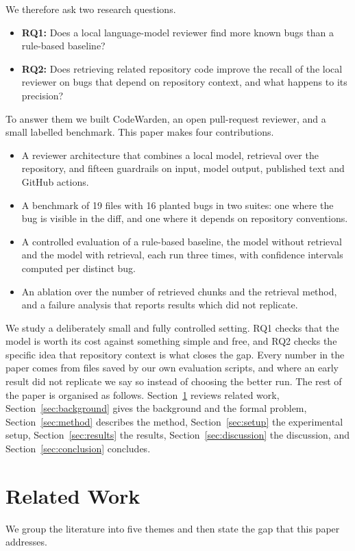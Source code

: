\documentclass[12pt,onecolumn,draftclsnofoot]{IEEEtran}
\begin{document}
We therefore ask two research questions.
\begin{itemize}
 \item \textbf{RQ1:} Does a local language-model reviewer find more known bugs than a rule-based baseline?
 \item \textbf{RQ2:} Does retrieving related repository code improve the recall of the local reviewer on bugs that depend on repository context, and what happens to its precision?
\end{itemize}

To answer them we built CodeWarden, an open pull-request reviewer, and a small labelled benchmark. This paper makes four contributions.
\begin{itemize}
 \item A reviewer architecture that combines a local model, retrieval over the repository, and fifteen guardrails on input, model output, published text and GitHub actions.
 \item A benchmark of 19 files with 16 planted bugs in two suites: one where the bug is visible in the diff, and one where it depends on repository conventions.
 \item A controlled evaluation of a rule-based baseline, the model without retrieval and the model with retrieval, each run three times, with confidence intervals computed per distinct bug.
 \item An ablation over the number of retrieved chunks and the retrieval method, and a failure analysis that reports results which did not replicate.
\end{itemize}
We study a deliberately small and fully controlled setting. RQ1 checks that the model is worth its cost against something simple and free, and RQ2 checks the specific idea that repository context is what closes the gap. Every number in the paper comes from files saved by our own evaluation scripts, and where an early result did not replicate we say so instead of choosing the better run.
The rest of the paper is organised as follows. Section~\ref{sec:related} reviews related work, Section~\ref{sec:background} gives the background and the formal problem, Section~\ref{sec:method} describes the method, Section~\ref{sec:setup} the experimental setup, Section~\ref{sec:results} the results, Section~\ref{sec:discussion} the discussion, and Section~\ref{sec:conclusion} concludes.


\section{Related Work}\label{sec:related}
We group the literature into five themes and then state the gap that this paper addresses.
\end{document}
